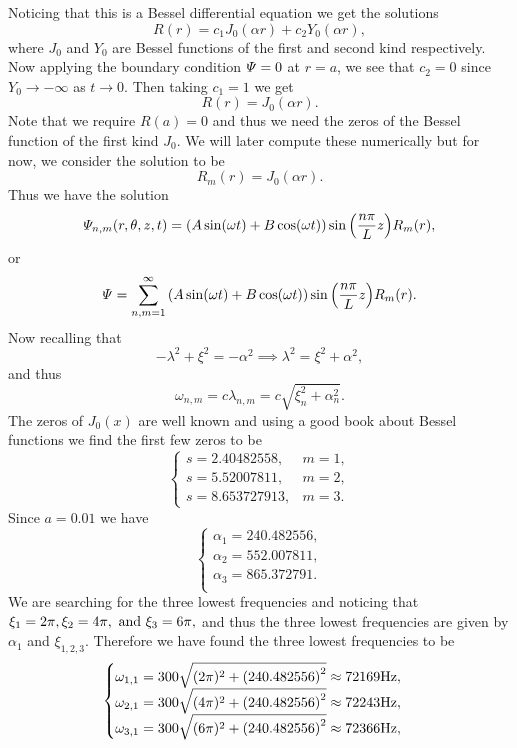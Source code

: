 \documentclass[12pt]{report}
\begin{document}
\begin{solution}
\[    \]
    Noticing that this is a Bessel differential equation we get the solutions
    \[
        R(r) = c_1 J_0(\alpha r) + c_2 Y_0(\alpha r),
    \]    
    where $J_0$ and $Y_0$ are Bessel functions of the first and second kind respectively. Now applying the boundary condition $\varPsi = 0$ at $r=a$, we see that $c_2=0$ since $Y_0 \to -\infty$ as $t\to 0$. Then taking $c_1 = 1$ we get
    \[
        R(r) = J_0(\alpha r).
    \]
    Note that we require $R(a) = 0$ and thus we need the zeros of the Bessel function of the first kind $J_0$. We will later compute these numerically but for now, we consider the solution to be 
    \[
        R_m(r) = J_0(\alpha r).
    \]
    Thus we have the solution
    \[
        \varPsi_{n,m}(r,\theta,z,t) = {\left(A\sin(\omega t) + B\cos(\omega t)\right)}\sin{\left(\frac{n \pi}{L}z\right)}R_m(r),
    \]
    or
    \[
        \varPsi = \sum_{n,m=1}^{\infty}{\left(A\sin(\omega t) + B\cos(\omega t)\right)}\sin{\left(\frac{n \pi}{L}z\right)}R_m(r).
    \]
    Now recalling that
    \[
        -\lambda^2 + \xi^2 = -\alpha^2 \implies \lambda^2 = \xi^2 + \alpha^2,
    \]  
    and thus
    \[
        \omega_{n,m} = c\lambda_{n,m} = c\sqrt{\xi^2_n + \alpha^2_n}.
    \]
    The zeros of $J_0(x)$ are well known and using a good book about Bessel functions we find the first few zeros to be
    \[
        \begin{cases}
            s = 2.40482558, &m=1,\\
            s = 5.52007811, &m=2,\\
            s = 8.653727913, &m=3.
        \end{cases}
    \] 
    Since $a = 0.01$ we have
    \[
        \begin{cases}
            \alpha_1 = 240.482556,\\
            \alpha_2 = 552.007811,\\
            \alpha_3 = 865.372791.\\
        \end{cases}
    \]
    We are searching for the three lowest frequencies and noticing that $\xi_1 = 2\pi, \xi_2 = 4\pi,{~\text{and}~} \xi_3=6\pi,$ and thus the three lowest frequencies are given by $\alpha_1$ and $\xi_{1,2,3}$. Therefore we have found the three lowest frequencies to be
    \[
        \begin{cases}
            \omega_{1,1} = 300 \sqrt{(2\pi)^2 + {\left(240.482556\right)}^2} \approx 72169 \mathrm{Hz},\\
            \omega_{2,1} = 300 \sqrt{(4\pi)^2 + {\left(240.482556\right)}^2} \approx 72243 \mathrm{Hz},\\
            \omega_{3,1} = 300 \sqrt{(6\pi)^2 + {\left(240.482556\right)}^2} \approx 72366 \mathrm{Hz},
        \end{cases}
    \]





\end{solution}
\end{document}
